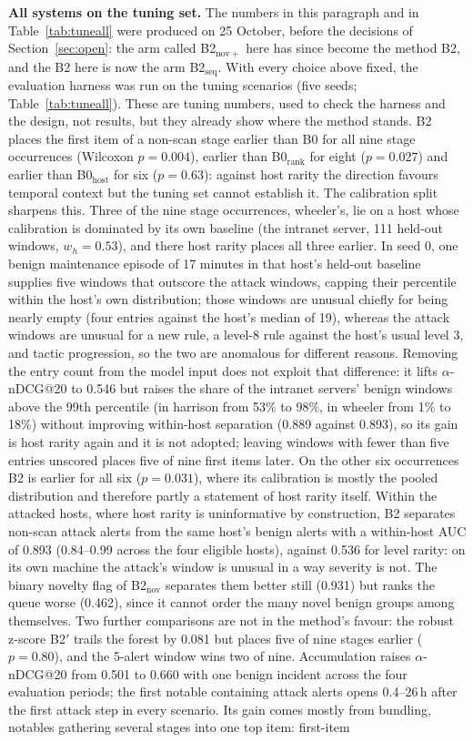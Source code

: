 \documentclass[conference]{IEEEtran}
\begin{document}
\textbf{All systems on the tuning set.} The numbers in this paragraph and in Table~\ref{tab:tuneall} were produced on 25 October, before the decisions of Section~\ref{sec:open}: the arm called B2$_\mathrm{nov+}$ here has since become the method B2, and the B2 here is now the arm B2$_\mathrm{seq}$. With every choice above fixed, the evaluation harness was run on the tuning scenarios (five seeds; Table~\ref{tab:tuneall}). These are tuning numbers, used to check the harness and the design, not results, but they already show where the method stands. B2 places the first item of a non-scan stage earlier than B0 for all nine stage occurrences (Wilcoxon $p = 0.004$), earlier than B0$_\mathrm{rank}$ for eight ($p = 0.027$) and earlier than B0$_\mathrm{host}$ for six ($p = 0.63$): against host rarity the direction favours temporal context but the tuning set cannot establish it. The calibration split sharpens this. Three of the nine stage occurrences, wheeler's, lie on a host whose calibration is dominated by its own baseline (the intranet server, 111 held-out windows, $w_h = 0.53$), and there host rarity places all three earlier. In seed 0, one benign maintenance episode of 17 minutes in that host's held-out baseline supplies five windows that outscore the attack windows, capping their percentile within the host's own distribution; those windows are unusual chiefly for being nearly empty (four entries against the host's median of 19), whereas the attack windows are unusual for a new rule, a level-8 rule against the host's usual level 3, and tactic progression, so the two are anomalous for different reasons. Removing the entry count from the model input does not exploit that difference: it lifts $\alpha$-nDCG@20 to 0.546 but raises the share of the intranet servers' benign windows above the 99th percentile (in harrison from 53\% to 98\%, in wheeler from 1\% to 18\%) without improving within-host separation (0.889 against 0.893), so its gain is host rarity again and it is not adopted; leaving windows with fewer than five entries unscored places five of nine first items later. On the other six occurrences B2 is earlier for all six ($p = 0.031$), where its calibration is mostly the pooled distribution and therefore partly a statement of host rarity itself. Within the attacked hosts, where host rarity is uninformative by construction, B2 separates non-scan attack alerts from the same host's benign alerts with a within-host AUC of 0.893 (0.84--0.99 across the four eligible hosts), against 0.536 for level rarity: on its own machine the attack's window is unusual in a way severity is not. The binary novelty flag of B2$_\mathrm{nov}$ separates them better still (0.931) but ranks the queue worse (0.462), since it cannot order the many novel benign groups among themselves. Two further comparisons are not in the method's favour: the robust z-score B2$'$ trails the forest by 0.081 but places five of nine stages earlier ($p = 0.80$), and the 5-alert window wins two of nine. Accumulation raises $\alpha$-nDCG@20 from 0.501 to 0.660 with one benign incident across the four evaluation periods; the first notable containing attack alerts opens 0.4--26\,h after the first attack step in every scenario. Its gain comes mostly from bundling, notables gathering several stages into one top item: first-item 
\end{document}
